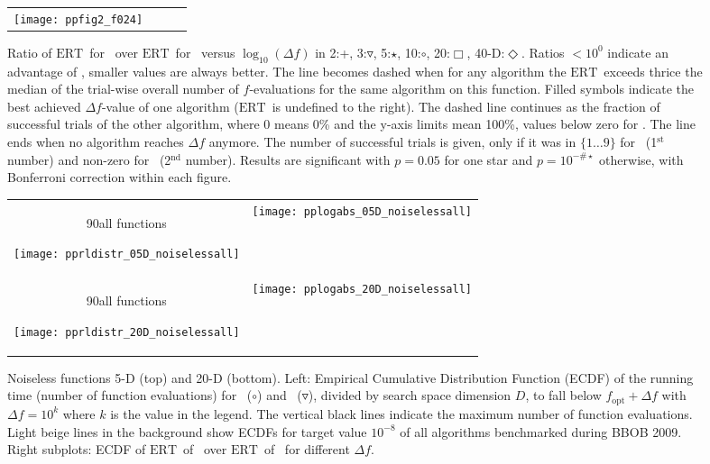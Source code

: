 \documentclass{article}
\newcommand{\ERT}{\ensuremath{\mathrm{ERT}}}
\newcommand{\Df}{\ensuremath{\Delta f}}
\newcommand{\fopt}{\ensuremath{f_\mathrm{opt}}}
\newcommand{\rot}[2][2.5]{
  \hspace*{-3.5\baselineskip}%
  \begin{rotate}{90}\hspace{#1em}#2
  \end{rotate}}
\begin{document}
\begin{figure}
\begin{tabular}{@{}c@{}c@{}c@{}c@{}}
\texttt{[image: ppfig2\_f024]}
\end{tabular}
\vspace*{-0.2cm}
\caption{\label{fig:ERTratiographs}Ratio of \ERT\ for \algorithmB\ over \ERT\ for
\algorithmA\ versus $\log_{10}(\Df)$ in
  2:{\color{cyan}+},
  3:{\color{green!45!black}$\triangledown$},
  5:{\color{blue}$\star$}, 
 10:$\circ$, 
 20:{\color{red}$\Box$}, 
 40-D:{\color{magenta}$\Diamond$}.
Ratios $<10^0$ indicate an advantage of \algorithmB, smaller
values are always better. The line becomes dashed when for any algorithm the \ERT\ exceeds thrice the median
of the trial-wise overall number of $f$-evaluations for the same algorithm on this function.
Filled symbols indicate the best achieved $\Df$-value of one algorithm (\ERT\ is undefined to the right).
The dashed line continues as the fraction of successful trials of the other
algorithm, where 0 means 0\% and the y-axis limits mean 100\%, values below
zero for \algorithmB. The line ends when no algorithm reaches $\Df$ anymore. 
The number of successful trials is given, only if it was in $\{1\dots9\}$ for
\algorithmB\ (1$^{\textrm{st}}$ number) and non-zero for \algorithmA\ (2$^{\textrm{nd}}$ number).
Results are significant with $p=0.05$ for one star and $p=10^{-\#\star}$
otherwise, with Bonferroni correction within each figure.}
\end{figure}
\begin{figure}[htbp!]
\centering
\begin{tabular}{@{}c@{}c@{}}
\rot[5]{all functions}\texttt{[image: pprldistr\_05D\_noiselessall]} &
\texttt{[image: pplogabs\_05D\_noiselessall]}\\
\rot[5]{all functions}\texttt{[image: pprldistr\_20D\_noiselessall]} &
\texttt{[image: pplogabs\_20D\_noiselessall]}
\end{tabular}
\caption{\label{fig:RLDs05Da}Noiseless functions 5-D (top) and 20-D (bottom).
Left:
Empirical Cumulative Distribution Function (ECDF) of the running time (number
of function evaluations) for \algorithmB\ ($\circ$) and \algorithmA\ ($\triangledown$), divided by
search space dimension $D$, to fall below $\fopt+\Df$ with $\Df = 10^k$ where
$k$ is the value in the legend. The vertical black lines indicate the maximum
number of function evaluations. Light beige lines in the background show ECDFs
for target value $10^{-8}$ of all algorithms benchmarked during BBOB 2009.
Right subplots: ECDF of \ERT\ of \algorithmB\ over \ERT\ of \algorithmA\ for
different $\Df$.
}
\end{figure}
\end{document}
